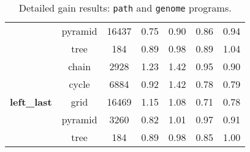 \begin{table}[ht]
{\begin{tabular}{cc|c|cc|cc}
&  pyramid &  16437 &  0.75  &  0.90  &  0.86 & 0.94 \\
&  tree &  184 &  0.89  &  0.98  &  0.89 & 1.04 \\
\hline
\multirow{5}{*}{\textbf{left\_last}} &  chain &  2928 &  1.23  &  1.42  &  0.95 & 0.90 \\
&  cycle &  6884 &  0.92  &  1.42  &  0.78 & 0.79 \\
&  grid &  16469 &  1.15  &  1.08  &  0.71 & 0.78 \\
&  pyramid &  3260 &  0.82  &  1.01  &  0.97 & 0.91 \\
&  tree &  184 &  0.89  &  0.98  &  0.85 & 1.00 \\
\hline
\hline
\end{tabular}
}
\caption{Detailed gain results: \texttt{path} and \texttt{genome} programs.}
\label{tbl:results_detail_gain_tst}
\end{table}
